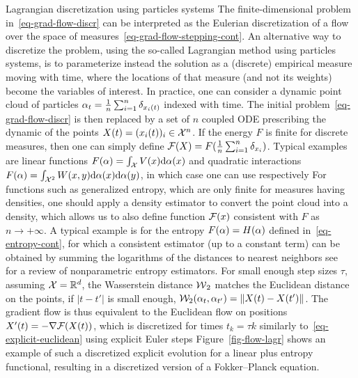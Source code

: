 \begin{rem1}{Lagrangian discretization using particles systems}\label{rem-lagr-discretization}
The finite-dimensional problem in~\eqref{eq-grad-flow-discr} can be interpreted as the Eulerian discretization of a flow over the space of measures~\eqref{eq-grad-flow-stepping-cont}.
%
An alternative way to discretize the problem, using the so-called Lagrangian method using particles systems, is to parameterize instead the solution as a (discrete) empirical measure moving with time, where the locations of that measure (and not its weights) become the variables of interest. In practice, one can consider a dynamic point cloud of particles $\alpha_t = \frac{1}{n}\sum_{i=1}^n \delta_{x_i(t)}$ indexed with time.
%
The initial problem~\eqref{eq-grad-flow-discr} is then replaced by a set of $n$ coupled ODE prescribing the dynamic of the points $X(t)=(x_i(t))_i \in \mathcal{X}^n$. 
%
If the energy $F$ is finite for discrete measures, then one can simply define $\mathcal{F}(X)=F( \frac{1}{n}\sum_{i=1}^n \delta_{x_i} )$. Typical examples are linear functions $F(\alpha) = \int_{\mathcal{X}} V(x) \mathrm{d}\alpha(x)$ and quadratic interactions $F(\alpha) = \int_{\mathcal{X}^2} W(x,y) \mathrm{d}\alpha(x)\mathrm{d}\alpha(y)$, in which case one can use respectively 
%
For functions such as generalized entropy, which are only finite for measures having densities, one should apply a density estimator to convert the point cloud into a density, which allows us to also define function $\mathcal{F}(x)$ consistent with $F$ as $n \rightarrow +\infty$. A typical example is for the entropy $F(\alpha) = H(\alpha)$ defined in~\eqref{eq-entropy-cont}, for which a consistent estimator (up to a constant term) can be obtained by summing the logarithms of the distances to nearest neighbors
see~\citet{beirlant1997nonparametric} for a review of nonparametric entropy estimators.
%
For small enough step sizes $\tau$, assuming $\mathcal{X}=\mathbb{R}^d$, the Wasserstein distance $\operatorname{\mathcal{W}}_2$ matches the Euclidean distance on the points, \ie if $|t-t'|$ is small enough, $\mathcal{W}_2(\alpha_t,\alpha_{t'})=\left\| X(t)-X(t') \right\|$. The gradient flow is thus equivalent to the Euclidean flow on positions $X'(t) = -\nabla \mathcal{F}(X(t))$, which is discretized for times $t_k=\tau k$ similarly to~\eqref{eq-explicit-euclidean} using explicit Euler steps
%
Figure~\ref{fig-flow-lagr} shows an example of such a discretized explicit evolution for a linear plus entropy functional, resulting in a discretized version of a Fokker--Planck equation.   

\end{rem1}
